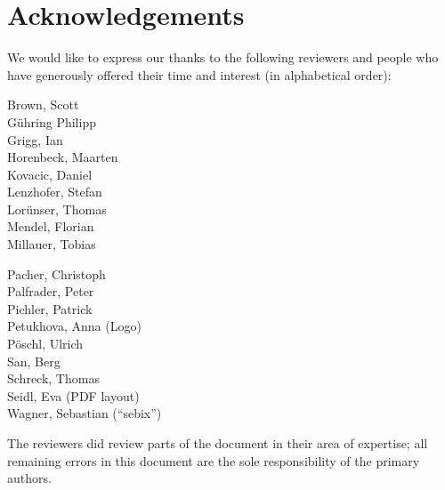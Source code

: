 \newpage
\section*{Acknowledgements}
\label{section:Reviewers}


We would like to express our thanks to the following reviewers and people who have generously offered their time and interest (in alphabetical order):


\vline{}

\begin{minipage}[b]{0.5\linewidth}
\center
Brown, Scott \\
G\"uhring Philipp  \\
Grigg, Ian  \\
Horenbeck, Maarten \\
Kovacic, Daniel \\
Lenzhofer, Stefan \\
Lor\"unser, Thomas \\
Mendel, Florian \\
Millauer, Tobias \\
\end{minipage}
\begin{minipage}[b]{0.5\linewidth}
\center
Pacher, Christoph \\
Palfrader, Peter \\
Pichler, Patrick \\
Petukhova, Anna (Logo) \\
P\"oschl, Ulrich \\
San, Berg \\
Schreck, Thomas  \\
Seidl, Eva (PDF layout) \\
Wagner, Sebastian (``sebix'') \\
\end{minipage}

\vline{}

The reviewers did review parts of the document in their area of
expertise; all remaining errors in this document are the sole
responsibility of the primary authors.



